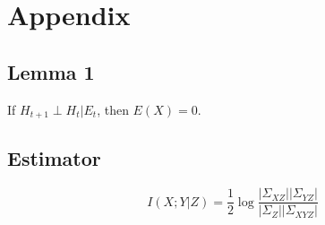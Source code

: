 \section{Appendix}

\subsection{Lemma 1}
If $H_{t+1} \perp H_t | E_t$, then $E(X)=0$.

\subsection{Estimator}
\[
I(X;Y|Z) = \frac{1}{2}\log \frac{|\Sigma_{XZ}||\Sigma_{YZ}|}{|\Sigma_Z||\Sigma_{XYZ}|}
\]
